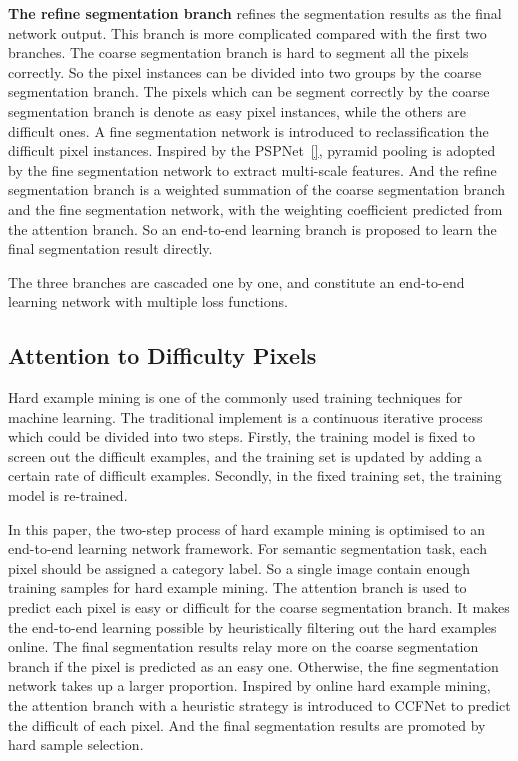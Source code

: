\documentclass[10.5pt,compsoc]{TsT}
\theoremstyle{mystyle}
\begin{document}
{\textbf{The refine segmentation branch} refines the segmentation results as the final network output.
This branch is more complicated compared with the first two branches.
The coarse segmentation branch is hard to segment all the pixels correctly.
So the pixel instances can be divided into two groups by the coarse segmentation branch.
The pixels which can be segment correctly by the coarse segmentation branch is denote as easy pixel instances, while the others are difficult ones.
A fine segmentation network is introduced to reclassification the difficult pixel instances.
Inspired by the PSPNet~\ref{}, pyramid pooling is adopted by the fine segmentation network to extract multi-scale features.
And the refine segmentation branch is a weighted summation of the coarse segmentation branch and the fine segmentation network, with the weighting coefficient predicted from the attention branch.
So an end-to-end learning branch is proposed to learn the final segmentation result directly.

The three branches are cascaded one by one, and constitute an end-to-end learning network with multiple loss functions.



\subsection{Attention to Difficulty Pixels}
\label{s:attention}
\noindent


Hard example mining is one of the commonly used training techniques for machine learning.
The traditional implement is a continuous iterative process which could be divided into two steps.
Firstly, the training model is fixed to screen out the difficult examples, and the training set is updated by adding a certain rate of difficult examples.
Secondly, in the fixed training set, the training model is re-trained.

In this paper, the two-step process of hard example mining is optimised to an end-to-end learning network framework.
For semantic segmentation task, each pixel should be assigned a category label.
So a single image contain enough training samples for hard example mining.
The attention branch is used to predict each pixel is easy or difficult for the coarse segmentation branch.
It makes the end-to-end learning possible by heuristically filtering out the hard examples online.
The final segmentation results relay more on the coarse segmentation branch if the pixel is predicted as an easy one.
Otherwise, the fine segmentation network takes up a larger proportion.
Inspired by online hard example mining, the attention branch with a heuristic strategy is introduced to CCFNet to predict the difficult of each pixel.
And the final segmentation results are promoted by hard sample selection.


}
\end{document}
